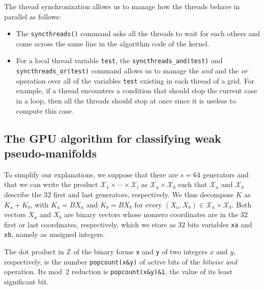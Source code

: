 \documentclass[11pt]{amsart}
\theoremstyle{plain}
\numberwithin{equation}{section}
\theoremstyle{definition}
\newcommand{\cX}{\mathcal{X}}
\newcommand{\Z}{\mathbb{Z}}
\begin{document}
The thread synchronization allows us to manage how the threads behave in parallel as follows:
\begin{itemize}
	\item The \texttt{syncthreads()} command asks all the threads to wait for each others and come across the same line in the algorithm code of the kernel.
	\item For a local thread variable \texttt{test}, the \texttt{syncthreads\_and(test)} and \texttt{syncthreads\_or(test)} command allows us to manage the \textit{and} and the \textit{or} operation over all of the variables \texttt{test} existing in each thread of a grid.
	For example, if a thread encounters a condition that should stop the current case in a loop, then all the threads should stop at once since it is useless to compute this case.
\end{itemize}

\subsection{The GPU algorithm for classifying weak pseudo-manifolds}\label{subsection:gpu_algo}

To simplify our explanations, we suppose that there are $s=64$ generators and that we can write the product $\cX_1\times\cdots\times \cX_l$ as $\cX_a\times \cX_b$ such that $\cX_a$ and $\cX_b$ describe the 32 first and last generators, respectively. We thus decompose $K$ as $K_a+K_b$, with $K_a = B X_a$ and $K_b = B X_b$ for every $(X_a,X_b)\in\cX_a\times\cX_b$.
Both vectors $X_a$ and $X_b$ are binary vectors whose nonzero coordinates are in the $32$ first or last coordinates, respectively, which we store as $32$ bits variables \texttt{xa} and \texttt{xb}, namely as unsigned integers.

The dot product in $\Z$ of the binary forms \texttt{x} and \texttt{y} of two integers $x$ and $y$, respectively, is the number \texttt{popcount(x\&y)} of active bits of the \emph{bitwise and} operation.
Its mod~$2$ reduction is \texttt{popcount(x\&y)\&1}, the value of its least significant bit.
\end{document}

